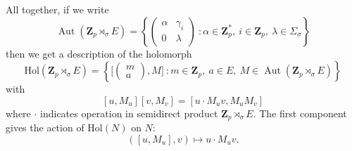\documentclass[12pt]{article}
\theoremstyle{definition}
\newcommand{\Z}{\mathbf Z}
\newcommand{\Hol}{\mathrm{Hol}}
\newcommand{\Aut}{\operatorname{Aut}}
\begin{document}
	All together, if we write
	$$
	\Aut(\Z_p\rtimes_{\sigma}E)=\left\{ \begin{pmatrix}
	\alpha & \gamma_i\\
	0&\lambda
	\end{pmatrix}\ \colon \alpha\in\Z_p^*,\ i\in\Z_p,\ \lambda\in\Sigma_{\sigma}\right\}
	$$
	then we get a description of the holomorph
	$$
	\Hol(\Z_p\rtimes_{\sigma}E)=\left\{\Big[\begin{pmatrix}
	m\\
	a
	\end{pmatrix}, M\Big]\ \colon m\in\Z_p,\ a\in E,\ M\in\Aut(\Z_p\rtimes_{\sigma}E) \right\}
	$$
	with
	$$
	[u, M_u][v,M_v]=[u\cdot M_u v,M_uM_v ]
	$$
	where $\cdot$ indicates operation in semidirect product $\Z_p\rtimes_{\sigma}E$. The first component gives the action of $\Hol(N)$ on $N$:
    $$
    ([u, M_u],v)\longmapsto u\cdot M_uv.
    $$
\end{document}
